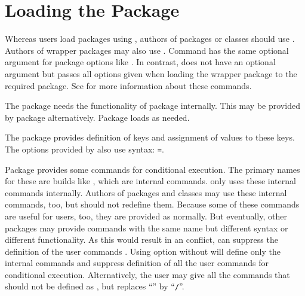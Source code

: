 \section{Loading the Package}
\label{sec:scrbase.loadit}

Whereas users load packages using , authors of packages or
classes should use . Authors of
wrapper packages may also use . Command
 has the same optional argument for package options like
. In contrast,  does not
have an optional argument but passes all options given when loading the
wrapper package to the required package. See \cite{latex:clsguide} for more
information about these commands.

The package  needs the functionality of package
 internally. This may be provided by
package  alternatively. Package  loads
 as needed.

The package  provides definition of keys and assignment of
values to these keys. The options provided by  also use
 syntax: \texttt{=}.

\begin{Declaration}
\end{Declaration}
%
Package  provides some commands for conditional
execution. The primary names for these are builds like
, which are internal commands. \KOMAScript{}
only uses these internal commands internally. Authors of packages and classes
may use these internal commands, too, but should not redefine them. Because
some of these commands are useful for users, too, they are provided as
 normally. But eventually, other packages may provide commands
with the same name but different syntax or different functionality. As this would
result in an conflict,  can suppress the
definition of the user commands . Using option
 without  will define only the internal
commands and suppress definition of all the user commands for conditional
execution. Alternatively, the user may give all the commands that should not
be defined as , but replaces ``\Macro{}'' by ``\texttt{/}''.

